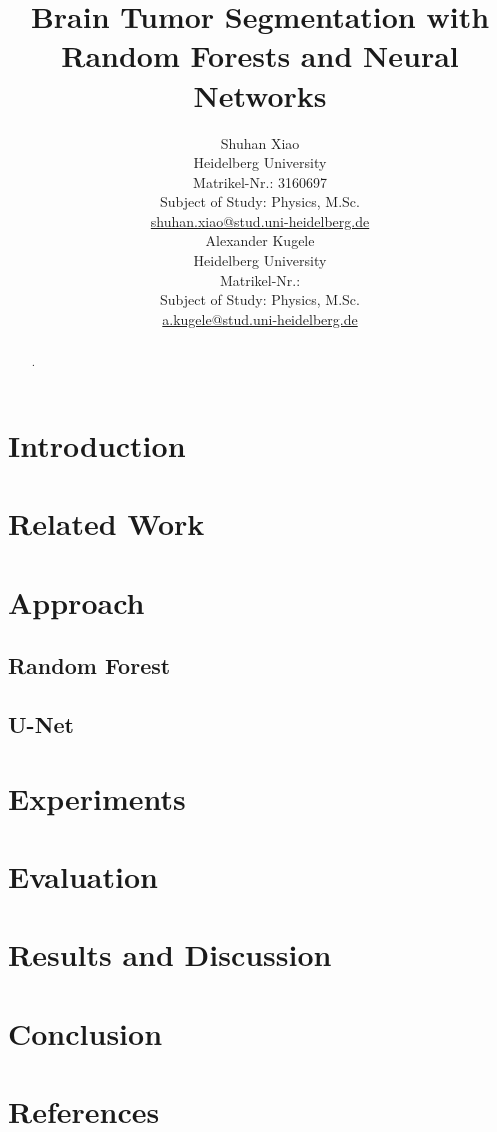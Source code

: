 \documentclass[final]{article}
\title{Brain Tumor Segmentation with Random Forests and Neural Networks}
\author{
  Shuhan Xiao \\
  Heidelberg University \\
  Matrikel-Nr.: 3160697 \\
  Subject of Study: Physics, M.Sc. \\
  \href{mailto:shuhan.xiao@stud.uni-heidelberg.de}{shuhan.xiao@stud.uni-heidelberg.de}\\
  \And
  Alexander Kugele \\
  Heidelberg University \\
  Matrikel-Nr.:  \\
  Subject of Study: Physics, M.Sc. \\
  \href{mailto:a.kugele@stud.uni-heidelberg.de}{a.kugele@stud.uni-heidelberg.de}\\
}
\begin{document}
\maketitle

\begin{abstract}
.
\end{abstract}

\section{Introduction}
\newpage
\section{Related Work}
\newpage
\section{Approach}
\subsection{Random Forest}
\newpage
\subsection{U-Net}
\newpage
\section{Experiments}
\newpage
\section{Evaluation}
\newpage
\section{Results and Discussion}
\newpage
\section{Conclusion}
\newpage
\section{References}
\end{document}
